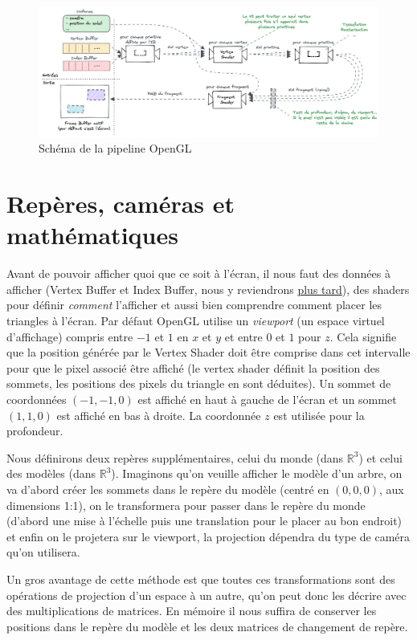 \documentclass{EPUProjetDi}
\begin{document}
\begin{figure}[th]
	\centering
	\includegraphics[scale=.3]{opengl_pipeline}
	\caption{Schéma de la pipeline OpenGL}
	\label{fig:opengl_pipeline}
\end{figure}

\section{Repères, caméras et mathématiques}

Avant de pouvoir afficher quoi que ce soit à l'écran, il nous faut des données à afficher (Vertex Buffer et Index Buffer, nous y reviendrons \hyperref[sec:instanced_rendering]{plus tard}), des shaders pour définir \textit{comment} l'afficher et aussi bien comprendre comment placer les triangles à l'écran.
Par défaut OpenGL utilise un \textit{viewport} (un espace virtuel d'affichage) compris entre $-1$ et $1$ en $x$ et $y$ et entre $0$ et $1$ pour $z$. Cela signifie que la position générée par le Vertex Shader doit être comprise dans cet intervalle pour que le pixel associé être affiché (le vertex shader définit la position des sommets, les positions des pixels du triangle en sont déduites). Un sommet de coordonnées $(-1,-1,0)$ est affiché en haut à gauche de l'écran et un sommet $(1,1,0)$ est affiché en bas à droite. La coordonnée $z$ est utilisée pour la profondeur.
\par
Nous définirons deux repères supplémentaires, celui du monde (dans $\mathbb{R}^3$) et celui des modèles (dans $\mathbb{R}^3$). Imaginons qu'on veuille afficher le modèle d'un arbre, on va d'abord créer les sommets dans le repère du modèle (centré en $(0,0,0)$, aux dimensions 1:1), on le transformera pour passer dans le repère du monde (d'abord une mise à l'échelle puis une translation pour le placer au bon endroit) et enfin on le projetera sur le viewport, la projection dépendra du type de caméra qu'on utilisera.

Un gros avantage de cette méthode est que toutes ces transformations sont des opérations de projection d'un espace à un autre, qu'on peut donc les décrire avec des multiplications de matrices. En mémoire il nous suffira de conserver les positions dans le repère du modèle et les deux matrices de changement de repère.
\end{document}

